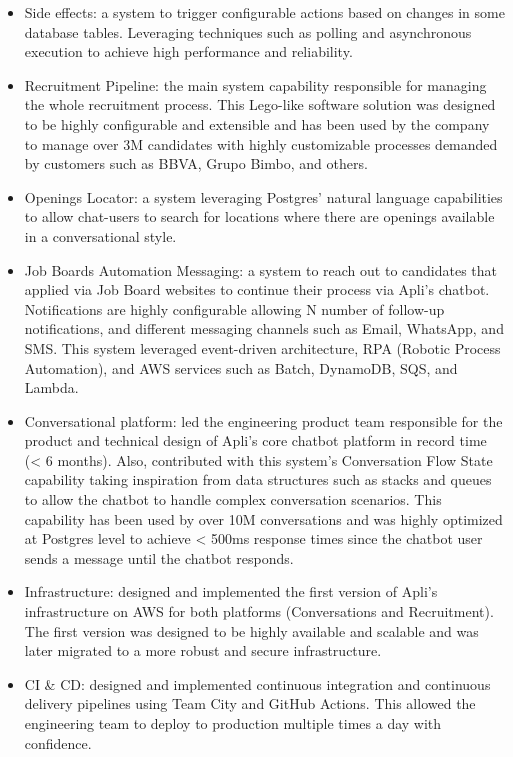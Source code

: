 \documentclass[9pt]{developercv} %
\begin{document}
\begin{entrylist}
{            \begin{itemize}
                \item Side effects: a system to trigger configurable actions based on changes in some database tables. Leveraging techniques such as polling and asynchronous execution to achieve high performance and reliability.
                \item Recruitment Pipeline: the main system capability responsible for managing the whole recruitment process. This Lego-like software solution was designed to be highly configurable and extensible and has been used by the company to manage over 3M candidates with highly customizable processes demanded by customers such as BBVA, Grupo Bimbo, and others.
                \item Openings Locator: a system leveraging Postgres' natural language capabilities to allow chat-users to search for locations where there are openings available in a conversational style.
                \item Job Boards Automation Messaging: a system to reach out to candidates that applied via Job Board websites to continue their process via Apli's chatbot. Notifications are highly configurable allowing N number of follow-up notifications, and different messaging channels such as Email, WhatsApp, and SMS. This system leveraged event-driven architecture, RPA (Robotic Process Automation), and AWS services such as Batch, DynamoDB, SQS, and Lambda.
                \item Conversational platform: led the engineering product team responsible for the product and technical design of Apli's core chatbot platform in record time (< 6 months). Also, contributed with this system's Conversation Flow State capability taking inspiration from data structures such as stacks and queues to allow the chatbot to handle complex conversation scenarios. This capability has been used by over 10M conversations and was highly optimized at Postgres level to achieve < 500ms response times since the chatbot user sends a message until the chatbot responds.
                \item Infrastructure: designed and implemented the first version of Apli's infrastructure on AWS for both platforms (Conversations and Recruitment). The first version was designed to be highly available and scalable and was later migrated to a more robust and secure infrastructure. 
                \item CI \& CD: designed and implemented continuous integration and continuous delivery pipelines using Team City and GitHub Actions. This allowed the engineering team to deploy to production multiple times a day with confidence.
            \end{itemize}

}
\end{entrylist}
\end{document}
